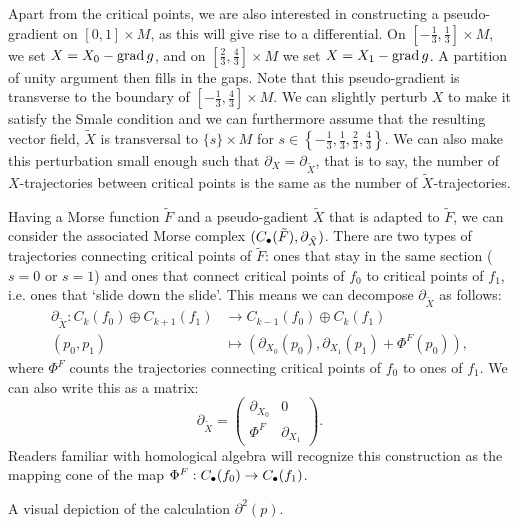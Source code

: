 \begin{myproof}
Apart from the critical points, we are also interested in constructing a pseudo-gradient on $[0,1]\times M$, as this will give rise to a differential.
 On $[-\frac{1}{3}, \frac{1}{3}] \times M$, we set $X = X_0 - \operatorname{grad} g$, and on $\left[\frac{2}{3}, \frac{4}{3}\right] \times M$ we set $X = X_1 - \operatorname{grad} g$.
A partition of unity argument then fills in the gaps.
Note that this pseudo-gradient is transverse to the boundary of $\left[-\frac{1}{3}, \frac{4}{3}\right] \times M$.
We can slightly perturb $X$ to make it satisfy the Smale condition and we can furthermore assume that the resulting vector field, $\tilde{X}$ is transversal to $ \{s\} \times M$ for $s \in \left\{-\frac{1}{3}, \frac{1}{3}, \frac{2}{3}, \frac{4}{3}\right\}$.
We can also make this perturbation small enough such that $\partial_{X} = \partial_{\tilde{X}}$, that is to say, the number of $X$-trajectories between critical points is the same as the number of $\tilde{X}$-trajectories.

Having a Morse function $\tilde{F}$ and a pseudo-gadient $\tilde{X}$ that is adapted to $\tilde{F}$, we can consider the associated Morse complex $(C_\bullet(\tilde{F}), \partial_{\tilde{X}})$.
There are two types of trajectories connecting critical points of $\tilde{F}$: ones that stay in the same section ($s = 0$ or $s = 1$)  and ones that connect critical points of $f_0$ to critical points of $f_1$, i.e. ones that `slide down the slide'.
This means we can decompose $\partial_{\tilde{X}}$ as follows:
\begin{align*}
    \partial_{\tilde{X}}: C_k(f_0) \oplus C_{k+1}(f_1) &\longrightarrow C_{k-1}(f_0) \oplus C_k(f_1) \\
    (p_0, p_1) &\longmapsto (\partial_{X_0}(p_0), \partial_{X_1}(p_1)+ \Phi^{F}(p_0))
,\end{align*}
where $\Phi^{F}$ counts the trajectories connecting critical points of $f_0$ to ones of $f_1$. We can also write this as a matrix:
\[
\partial_{\tilde{X}} = \begin{pmatrix}
    \partial_{X_0} & 0 \\
     \Phi^{F}& \partial_{X_1}
\end{pmatrix}
.\] 
Readers familiar with homological algebra will recognize this construction as the mapping cone of the map $\Phi^{F}: C_\bullet(f_0) \to  C_\bullet(f_1)$.

\begin{marginfigure}
    \centering
    \caption{A visual depiction of the calculation $\partial^2(p)$.}
    \label{fig:morse-homology-independence-partial-squared-zero}
\end{marginfigure}


\end{myproof}
